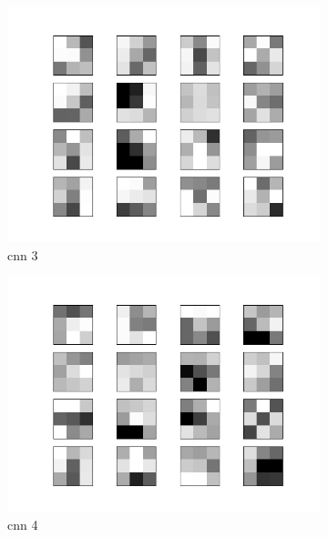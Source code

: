 \documentclass{assignment}
\begin{document}
\begin{figure}[htbp!]
\begin{subfigure}{0.3\textwidth}
        \includegraphics[width=\textwidth]{figures/weights_cnn_3.png}
        \caption{cnn 3}
    \end{subfigure}
    \hfill
    \begin{subfigure}{0.3\textwidth}
        \includegraphics[width=\textwidth]{figures/weights_cnn_4.png}
        \caption{cnn 4}
    \end{subfigure}\hfill
    \begin{subfigure}{0.3\textwidth}

\end{subfigure}
\end{figure}
\end{document}
